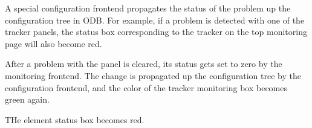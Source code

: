 A special configuration frontend propagates the status of the problem up the
configuration tree in ODB. For example, if a problem is detected with one of the
tracker panels, the status box corresponding to the tracker on the top monitoring
page will also become red.

After a problem with the panel is cleared, its status gets set to zero by the
monitoring frontend. The change is propagated up the configuration tree
by the configuration frontend, and the color of the tracker monitoring box
becomes green again.


THe element status box becomes red. 

